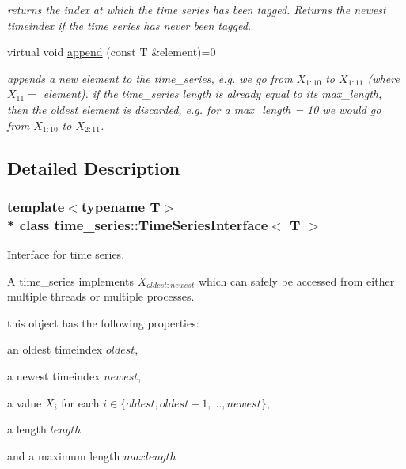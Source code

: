 \begin{DoxyCompactItemize}
\begin{DoxyCompactList}\small\item\em returns the index at which the time series has been tagged. Returns the newest timeindex if the time series has never been tagged. \end{DoxyCompactList}\item 
virtual void \hyperlink{classtime__series_1_1TimeSeriesInterface_a0782c522287cf041fc253529b61041f9}{append} (const T \&element)=0\hypertarget{classtime__series_1_1TimeSeriesInterface_a0782c522287cf041fc253529b61041f9}{}\label{classtime__series_1_1TimeSeriesInterface_a0782c522287cf041fc253529b61041f9}

\begin{DoxyCompactList}\small\item\em appends a new element to the time\+\_\+series, e.\+g. we go from $ X_{1:10} $ to $ X_{1:11} $ (where $ X_{11}=$ element). if the time\+\_\+series length is already equal to its max\+\_\+length, then the oldest element is discarded, e.\+g. for a max\+\_\+length = 10 we would go from $ X_{1:10} $ to $ X_{2:11} $. \end{DoxyCompactList}\end{DoxyCompactItemize}


\subsection{Detailed Description}
\subsubsection*{template$<$typename T$>$\\*
class time\+\_\+series\+::\+Time\+Series\+Interface$<$ T $>$}

Interface for time series. 

A time\+\_\+series implements $ X_{{oldest}:{newest}} $ which can safely be accessed from either multiple threads or multiple processes.

this object has the following properties\+:
\begin{DoxyItemize}
\item an oldest timeindex $ oldest$,
\item a newest timeindex $ newest $,
\item a value $ X_i $ for each $ i \in \{oldest, oldest + 1 , ..., newest\} $,
\item a length $length$
\item and a maximum length $maxlength$ 
\end{DoxyItemize}

